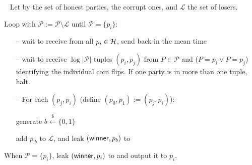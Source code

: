\begin{minipage}{0.5\textwidth}
\begin{bbox}[title={Functionality $\F_\m{lottery}(\mathcal{P} = p_1,...p_n)$}]
~
Let \honest by the set of honest parties, \crupt the corrupt ones, and $\mathcal{L}$ the set of losers.

Loop with $\mathcal{P} := \mathcal{P} \setminus \mathcal{L}$ until $\mathcal{P} = \{p_i\}$:

\hspace*{0.5cm}%
\begin{minipage}{0.8\textwidth}
\begin{itemize}[leftmargin=*]
\item[--] wait to receive  from all $p_i \in \mathcal{H}$, send  back in the mean time
\item[--] wait to receive $\log |\mathcal{P}|$ tuples $(p_i, p_j)$ from $P \in \mathcal{P}$ and ($P = p_i \vee P = p_j$) identifying the individual coin flips. If one party is in more than one tuple, halt.
\item[--] For each $(p_j, p_i)$ (define $(p_0, p_1) := (p_j, p_i)$):

\quad generate $b \xleftarrow{\$} \{0, 1\}$

\quad add $p_{! b}$ to $\mathcal{L}$, and leak $({\mathsf {winner}}, p_b)$ to \A
\end{itemize}
\end{minipage}%

When $\mathcal{P} = \{p_i\}$, leak $({\mathsf {winner}}, p_i)$ to \A and output it to $p_i$.

\end{bbox}
\end{minipage}
